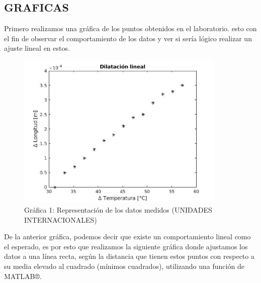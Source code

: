 \documentclass[journal,transmag]{IEEEtran}
\begin{document}
  

\subsection{GRAFICAS} 

  

Primero realizamos una gráfica de los puntos obtenidos en el laboratorio. esto con el fin de observar el comportamiento de los datos y ver si sería lógico realizar un ajuste lineal en estos. 

  

\begin{figure}[!h] 

\center 

\includegraphics[width=10cm]{g1.jpg} 

\caption{Gráfica 1: Representación de los datos medidos (UNIDADES INTERNACIONALES)} 

\label{6} 

\end{figure} 

  

De la anterior gráfica, podemos decir que existe un comportamiento lineal como el esperado, es por esto que realizamos la siguiente gráfica donde ajustamos los datos a una línea recta, según la distancia que tienen estos puntos con respecto a su media elevado al cuadrado (mínimos cuadrados), utilizando una función de MATLAB®.  

  
\end{document}
